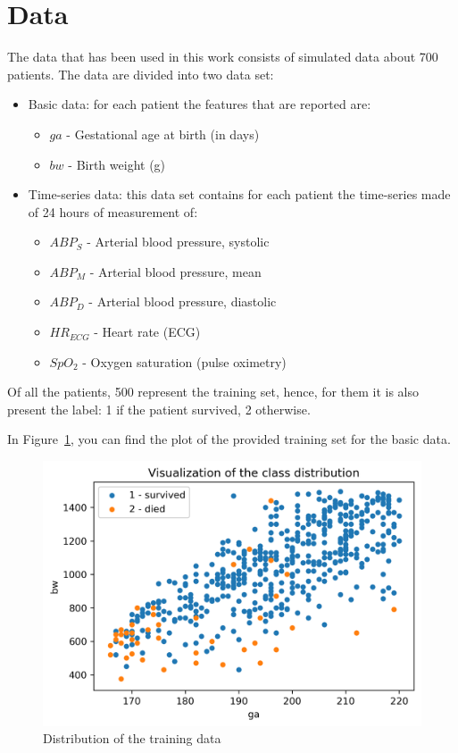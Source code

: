 \documentclass[a4paper,11pt]{article}
\begin{document}
\section{Data} %
The data that has been used in this work consists of simulated data about 700 patients. The data are divided into two data set:
\begin{itemize}
    \item Basic data: for each patient the features that are reported are:
    \begin{itemize}
        \item $ga$ - Gestational age at birth (in days)
        \item $bw$ - Birth weight (g)
    \end{itemize}
    \item Time-series data: this data set contains for each patient the time-series made of 24 hours of measurement of:
    \begin{itemize}
        \item $ABP_S$ - Arterial blood pressure, systolic
        \item $ABP_M$ - Arterial blood pressure, mean
        \item $ABP_D$ - Arterial blood pressure, diastolic
        \item $HR_{ECG}$ - Heart rate (ECG)
        \item $SpO_2$ - Oxygen saturation (pulse oximetry)
    \end{itemize}
\end{itemize}
Of all the patients, 500 represent the training set, hence, for them it is also present the label: 1 if the patient survived, 2 otherwise.

In Figure~\ref{fig:training}, you can find the plot of the provided training set for the basic data.

\begin{figure}[H]
    \centering
    \includegraphics{raw_vis.png}
    \caption{Distribution of the training data}
    \label{fig:training}
\end{figure}
\end{document}

